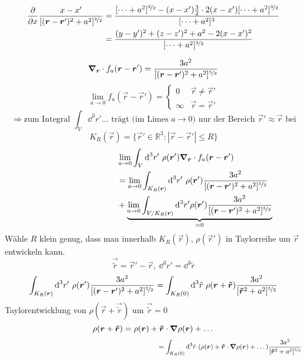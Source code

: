 \begin{align*}
\frac{\partial }{\partial x} \frac{x-x'}{[(\bm{r}-\bm{r}')^2 + a^2]^{\nicefrac{3}{2}}} &= \frac{[\dots +a^2]^{\nicefrac{3}{2}} - (x - x') \frac{3}{2} \cdot 2(x-x') [\dots + a^2]^{\nicefrac{3}{2}}}{[\dots + a^2]^3}\\
&= \frac{(y - y')^2 + (z - z')^2 + a^2 - 2(x - x')^2}{[\dots + a^2]^{\nicefrac{3}{2}}}
\end{align*}

$$\bm{\nabla}_{\bm{r}} \cdot f_a(\bm{r}-\bm{r}') = \frac{3a^2}{[(\bm{r}-\bm{r}')^2 + a^2]^{\nicefrac{5}{2}}}$$
$$\lim_{a \to 0} f_a(\vec{r}-\vec{r}') = \left\{ \begin{array}{cc}
0 & \vec{r} \neq \vec{r}'\\
\infty & \vec{r} = \vec{r}'	
\end{array} \right.$$
%
%
%
%
%
%
$$\Rightarrow \textrm{zum Integral } \int_V \dd^3r' \dots \textrm{ trägt (im Limes }a \to 0) \textrm{ nur der Bereich } \vec{r}' \approx \vec{r} \textrm{ bei}$$
$$K_R (\vec{r}) = \{\vec{r}' \in \mathbb R^3: |\vec{r} - \vec{r}'| \leq R\}$$
%
%
%
%
%
%
\begin{align*}
 	\hspace{100pt} &\lim_{a \to 0} \int_V \dd^3 r'\ \rho(\vec{r}') \vabla_{\vec{r}} \cdot f_a(\vec{r}- \vec{r}')\\
	&= \lim_{a \to 0} \int_{K_R (\vec{r})} \dd^3 r' \ \rho(\vec{r}') \frac{3a^2}{[(\vec{r}-\vec{r}')^2 + a^2]^{\nicefrac{5}{2}}}\\
 	&+ \underbrace{\lim_{a \to 0} \int_{V / K_R (\vec{r})} \dd^3 r' \rho(\vec{r}') \frac{3a^2}{[(\vec{r}-\vec{r}')^2 + a^2]^{\nicefrac{5}{2}}}}_{= 0}
\end{align*}
Wähle $R$ klein genug, dass man innerhalb $K_R (\vec{r})$, $\rho(\vec{r}')$ in Taylorreihe um $\vec{r}$ entwickeln kann.
$$\vec{\tilde{r}} = \vec{r}' - \vec{r},\ \dd^3 r' = \dd^3 \tilde{r}$$
$$\int_{K_R (\vec{r})} \dd^3 r' \ \rho(\vec{r}') \frac{3a^2}{[(\vec{r}-\vec{r}')^2 + a^2]^{\nicefrac{5}{2}}} = \int_{K_R (0)} \dd^3 \tilde{r} \ \rho(\vec{r} + \vec{\tilde{r}}) \frac{3a^2}{[\vec{\tilde{r}}^2 + a^2]^{\nicefrac{5}{2}}}$$
Taylorentwicklung von $\rho(\vec{r} + \vec{\tilde{r}})$ um $\vec{\tilde{r}} = 0$
$$\rho(\bm{r} + \bm{\tilde{r}}) = \rho(\bm{r}) + \bm{\tilde{r}} \cdot \bm{\nabla} \rho(\bm{r}) + \dots$$
$$\hspace{8.1cm} = \int_{K_R (0)} \dd^3 \tilde{r} \ (\rho(\vec{r}) + \vec{\tilde{r}} \cdot \vabla \rho(\vec{r}) + \dots) \frac{3a^2}{[\vec{\tilde{r}}^2 + a^2]^{\nicefrac{5}{2}}}$$
